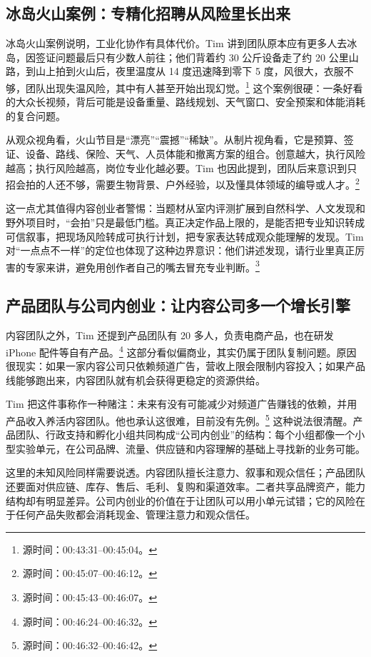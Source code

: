 \subsection{冰岛火山案例：专精化招聘从风险里长出来}

冰岛火山案例说明，工业化协作有具体代价。Tim 讲到团队原本应有更多人去冰岛，因签证问题最后只有少数人前往；他们背着约 30 公斤设备走了约 20 公里山路，到山上拍到火山后，夜里温度从 14 度迅速降到零下 5 度，风很大，衣服不够，团队出现失温风险，其中有人甚至开始出现幻觉。\footnote{源时间：00:43:31--00:45:04。} 这个案例很硬：一条好看的大众长视频，背后可能是设备重量、路线规划、天气窗口、安全预案和体能消耗的复合问题。

从观众视角看，火山节目是“漂亮”“震撼”“稀缺”。从制片视角看，它是预算、签证、设备、路线、保险、天气、人员体能和撤离方案的组合。创意越大，执行风险越高；执行风险越高，岗位专业化越必要。Tim 也因此提到，团队后来意识到只招会拍的人还不够，需要生物背景、户外经验，以及懂具体领域的编导或人才。\footnote{源时间：00:45:07--00:46:12。}

这一点尤其值得内容创业者警惕：当题材从室内评测扩展到自然科学、人文发现和野外项目时，“会拍”只是最低门槛。真正决定作品上限的，是能否把专业知识转成可信叙事，把现场风险转成可执行计划，把专家表达转成观众能理解的发现。Tim 对“一点点不一样”的定位也体现了这种边界意识：他们讲述发现，请行业里真正厉害的专家来讲，避免用创作者自己的嘴去冒充专业判断。\footnote{源时间：00:45:43--00:46:07。}

\subsection{产品团队与公司内创业：让内容公司多一个增长引擎}

内容团队之外，Tim 还提到产品团队有 20 多人，负责电商产品，也在研发 iPhone 配件等自有产品。\footnote{源时间：00:46:24--00:46:32。} 这部分看似偏商业，其实仍属于团队复制问题。原因很现实：如果一家内容公司只依赖频道广告，营收上限会限制内容投入；如果产品线能够跑出来，内容团队就有机会获得更稳定的资源供给。

Tim 把这件事称作一种赌注：未来有没有可能减少对频道广告赚钱的依赖，并用产品收入养活内容团队。他也承认这很难，目前没有先例。\footnote{源时间：00:46:32--00:46:42。} 这种说法很清醒。产品团队、行政支持和孵化小组共同构成“公司内创业”的结构：每个小组都像一个小型实验单元，在公司品牌、流量、供应链和内容理解的基础上寻找新的业务可能。

这里的未知风险同样需要说透。内容团队擅长注意力、叙事和观众信任；产品团队还要面对供应链、库存、售后、毛利、复购和渠道效率。二者共享品牌资产，能力结构却有明显差异。公司内创业的价值在于让团队可以用小单元试错；它的风险在于任何产品失败都会消耗现金、管理注意力和观众信任。

